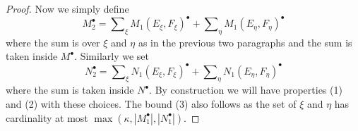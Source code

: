 \documentclass[10pt,a4paper]{amsart}
\theoremstyle{plain}
\theoremstyle{definition}
\theoremstyle{remark}
\numberwithin{equation}{subsection}
\begin{document}
\begin{proof}
\medskip\noindent
Now we simply define
$$
M_2^\bullet =
\sum\nolimits_\xi M_1(E_\xi, F_\xi)^\bullet +
\sum\nolimits_\eta M_1(E_\eta, F_\eta)^\bullet
$$
where the sum is over $\xi$ and $\eta$ as in the previous two paragraphs
and the sum is taken inside $M^\bullet$. Similarly we set
$$
N_2^\bullet =
\sum\nolimits_\xi N_1(E_\xi, F_\xi)^\bullet +
\sum\nolimits_\eta N_1(E_\eta, F_\eta)^\bullet
$$
where the sum is taken inside $N^\bullet$. By construction we will
have properties (1) and (2) with these choices.
The bound (3) also follows as the set of
$\xi$ and $\eta$ has cardinality at most
$\max(\kappa, |M_1^\bullet|, |N_1^\bullet|)$.
\end{proof}
\end{document}
